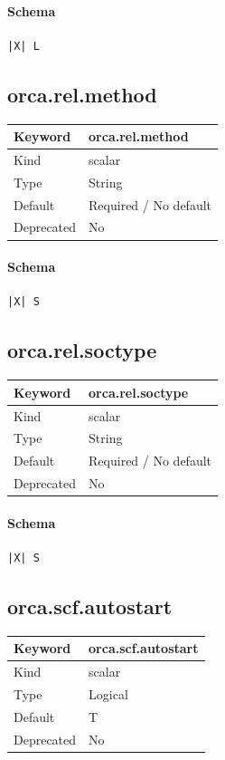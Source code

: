 \documentclass[11pt]{article}
\begin{document}
{{{{{\paragraph{Schema}
\begin{Verbatim}
|X| L
\end{Verbatim}

\subsection{orca.rel.method}
\label{kw:orca-rel-method}
\begin{longtable}{|p{1.5in}|p{4.5in}|}
\hline
Keyword & orca.rel.method \\
\hline
Kind & scalar \\
\hline
Type & String \\
\hline
Default & Required / No default \\
\hline
Deprecated & No \\
\hline
\end{longtable}
\paragraph{Schema}
\begin{Verbatim}
|X| S
\end{Verbatim}

\subsection{orca.rel.soctype}
\label{kw:orca-rel-soctype}
\begin{longtable}{|p{1.5in}|p{4.5in}|}
\hline
Keyword & orca.rel.soctype \\
\hline
Kind & scalar \\
\hline
Type & String \\
\hline
Default & Required / No default \\
\hline
Deprecated & No \\
\hline
\end{longtable}
\paragraph{Schema}
\begin{Verbatim}
|X| S
\end{Verbatim}

\subsection{orca.scf.autostart}
\label{kw:orca-scf-autostart}
\begin{longtable}{|p{1.5in}|p{4.5in}|}
\hline
Keyword & orca.scf.autostart \\
\hline
Kind & scalar \\
\hline
Type & Logical \\
\hline
Default & T \\
\hline
Deprecated & No \\
\hline
\end{longtable}
}}}}}
\end{document}
